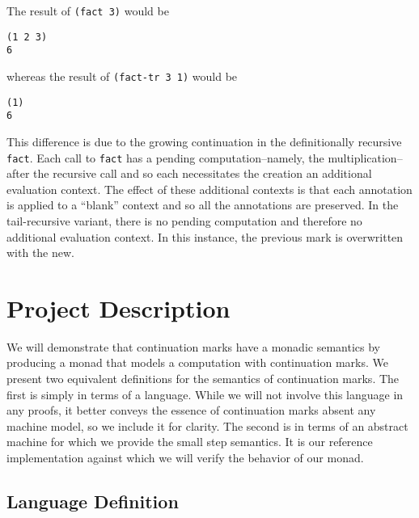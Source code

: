 \documentclass[ms]{byuprop}
\newcounter{definition}
\begin{document}
The result of \texttt{(fact 3)} would be

\begin{verbatim}
(1 2 3)
6
\end{verbatim}

whereas the result of \texttt{(fact-tr 3 1)} would be

\begin{verbatim}
(1)
6
\end{verbatim}

This difference is due to the growing continuation in the definitionally recursive
\texttt{fact}. Each call to \texttt{fact} has a pending computation--namely, the
multiplication--after the recursive call and so each necessitates the creation an
additional evaluation context. The effect of these additional contexts is that each
annotation is applied to a ``blank'' context and so all the annotations are preserved. In
the tail-recursive variant, there is no pending computation and therefore no additional
evaluation context. In this instance, the previous mark is overwritten with the new.




\section{Project Description}

We will demonstrate that continuation marks have a monadic semantics by producing a monad
that models a computation with continuation marks. We present two equivalent definitions 
for the semantics of continuation marks. The first is simply in terms of a language. While 
we will not involve this language in any proofs, it better conveys the essence of continuation 
marks absent any machine model, so we include it for clarity. The second is in terms of an 
abstract machine for which we provide the small step semantics. It is our reference 
implementation against which we will verify the behavior of our monad.

\subsection{Language Definition}
\end{document}

